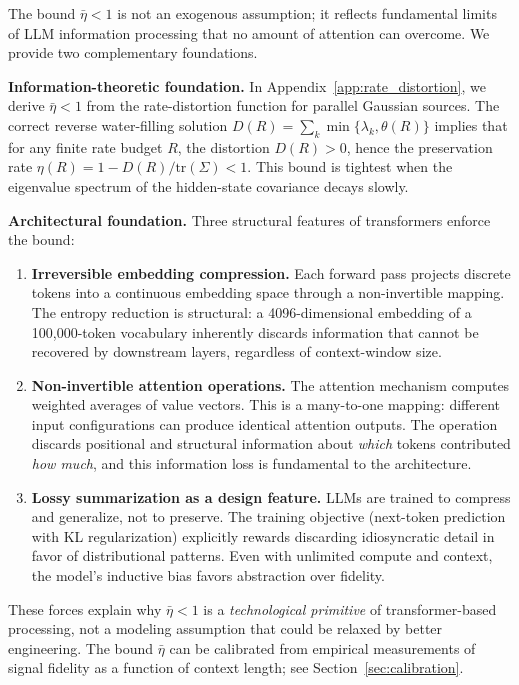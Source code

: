 \begin{remark}\label{rem:eta_bar_microfoundation}
The bound $\bar{\eta} < 1$ is not an exogenous assumption; it reflects fundamental limits of LLM information processing that no amount of attention can overcome. We provide two complementary foundations.

\textbf{Information-theoretic foundation.} In Appendix~\ref{app:rate_distortion}, we derive $\bar{\eta} < 1$ from the rate-distortion function for parallel Gaussian sources. The correct reverse water-filling solution $D(R) = \sum_k \min\{\lambda_k, \theta(R)\}$ implies that for any finite rate budget $R$, the distortion $D(R) > 0$, hence the preservation rate $\eta(R) = 1 - D(R)/\text{tr}(\Sigma) < 1$. This bound is tightest when the eigenvalue spectrum of the hidden-state covariance decays slowly.

\textbf{Architectural foundation.} Three structural features of transformers enforce the bound:
\begin{enumerate}[label=(\roman*)]
\item \textbf{Irreversible embedding compression.} Each forward pass projects discrete tokens into a continuous embedding space through a non-invertible mapping. The entropy reduction is structural: a 4096-dimensional embedding of a 100,000-token vocabulary inherently discards information that cannot be recovered by downstream layers, regardless of context-window size.
\item \textbf{Non-invertible attention operations.} The attention mechanism computes weighted averages of value vectors. This is a many-to-one mapping: different input configurations can produce identical attention outputs. The operation discards positional and structural information about \emph{which} tokens contributed \emph{how much}, and this information loss is fundamental to the architecture.
\item \textbf{Lossy summarization as a design feature.} LLMs are trained to compress and generalize, not to preserve. The training objective (next-token prediction with KL regularization) explicitly rewards discarding idiosyncratic detail in favor of distributional patterns. Even with unlimited compute and context, the model's inductive bias favors abstraction over fidelity.
\end{enumerate}
These forces explain why $\bar{\eta} < 1$ is a \emph{technological primitive} of transformer-based processing, not a modeling assumption that could be relaxed by better engineering. The bound $\bar{\eta}$ can be calibrated from empirical measurements of signal fidelity as a function of context length; see Section~\ref{sec:calibration}.
\end{remark}

